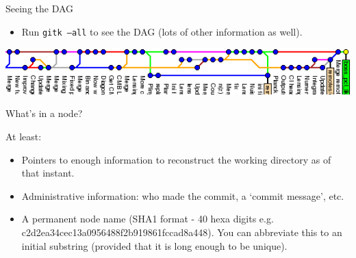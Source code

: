 \documentclass[usenames,dvipsnames]{beamer}
\newcommand{\code}[1]{\colorbox{light-gray}{\texttt{#1}}}
\begin{document}
\begin{frame}{Seeing the DAG}
  \begin{block}{}
    \begin{itemize}
      \item{Run \code{gitk --all} to see the DAG (lots of other information as well).}
    \end{itemize}
  \end{block}
  \begin{block}{}
    \begin{center}
      \includegraphics[scale=0.8]{DAG.png}
    \end{center}
  \end{block}
\end{frame}


\begin{frame}{What's in a node?}
  \begin{block}{}
    At least:
    \begin{itemize}
      \item{Pointers to enough information to reconstruct the working directory as of that instant.}
      \item{Administrative information: who made the commit, a `commit message', etc.}
      \item{A permanent node name (SHA1 format - 40 hexa digits e.g. c2d2ea34cec13a0956488f2b919861fccad8a448). You can abbreviate this to an initial substring (provided that it is long enough to be unique).}
    \end{itemize}
  \end{block}
\end{frame}
\end{document}
